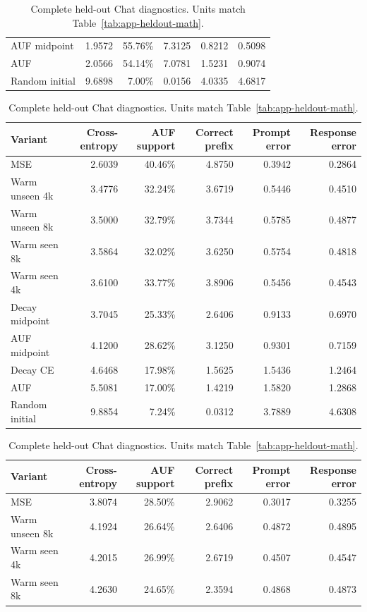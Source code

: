 \begin{table}[htbp]
\begin{tabular}{lrrrrr}
AUF midpoint & 1.9572 & 55.76\% & 7.3125 & 0.8212 & 0.5098 \\
AUF & 2.0566 & 54.14\% & 7.0781 & 1.5231 & 0.9074 \\
Random initial & 9.6898 & 7.00\% & 0.0156 & 4.0335 & 4.6817 \\
\bottomrule
\end{tabular}
\par\medskip
\caption{Complete held-out Code diagnostics. Units match Table~\ref{tab:app-heldout-math}.}
\label{tab:app-heldout-code}
\begin{tabular}{lrrrrr}
\toprule
Variant & Cross-entropy & AUF support & Correct prefix & Prompt error & Response error \\
\midrule
MSE & 2.6039 & 40.46\% & 4.8750 & 0.3942 & 0.2864 \\
Warm unseen 4k & 3.4776 & 32.24\% & 3.6719 & 0.5446 & 0.4510 \\
Warm unseen 8k & 3.5000 & 32.79\% & 3.7344 & 0.5785 & 0.4877 \\
Warm seen 8k & 3.5864 & 32.02\% & 3.6250 & 0.5754 & 0.4818 \\
Warm seen 4k & 3.6100 & 33.77\% & 3.8906 & 0.5456 & 0.4543 \\
Decay midpoint & 3.7045 & 25.33\% & 2.6406 & 0.9133 & 0.6970 \\
AUF midpoint & 4.1200 & 28.62\% & 3.1250 & 0.9301 & 0.7159 \\
Decay CE & 4.6468 & 17.98\% & 1.5625 & 1.5436 & 1.2464 \\
AUF & 5.5081 & 17.00\% & 1.4219 & 1.5820 & 1.2868 \\
Random initial & 9.8854 & 7.24\% & 0.0312 & 3.7889 & 4.6308 \\
\bottomrule
\end{tabular}
\par\medskip
\caption{Complete held-out Chat diagnostics. Units match Table~\ref{tab:app-heldout-math}.}
\label{tab:app-heldout-chat}
\begin{tabular}{lrrrrr}
\toprule
Variant & Cross-entropy & AUF support & Correct prefix & Prompt error & Response error \\
\midrule
MSE & 3.8074 & 28.50\% & 2.9062 & 0.3017 & 0.3255 \\
Warm unseen 8k & 4.1924 & 26.64\% & 2.6406 & 0.4872 & 0.4895 \\
Warm seen 4k & 4.2015 & 26.99\% & 2.6719 & 0.4507 & 0.4547 \\
Warm seen 8k & 4.2630 & 24.65\% & 2.3594 & 0.4868 & 0.4873 \\

\end{tabular}
\end{table}
